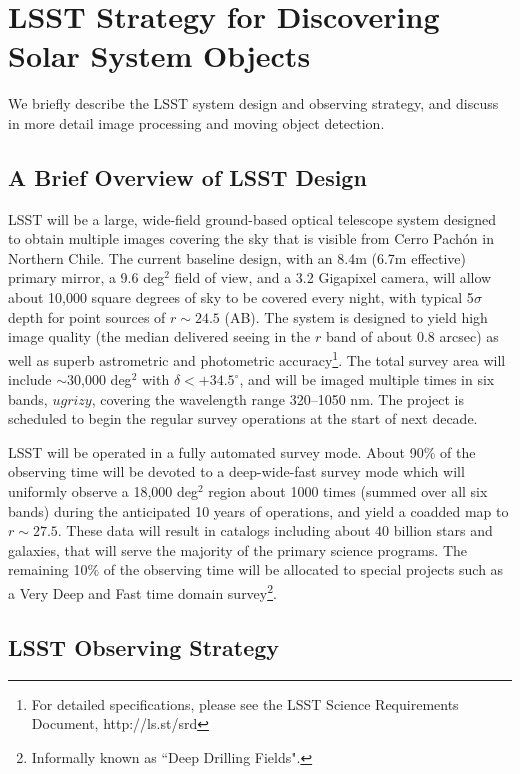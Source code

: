 \section{LSST Strategy for Discovering Solar System Objects} 

We briefly describe the LSST system design and observing strategy, and discuss in more
detail image processing and moving object detection. 

\subsection{A Brief Overview of LSST  Design} 

LSST will be a large, wide-field ground-based optical telescope system
designed to obtain multiple images covering the sky that is visible
from Cerro Pach\'{o}n in Northern Chile. The current baseline design,
with an 8.4m (6.7m effective) primary mirror, a 9.6 deg$^2$ field of
view, and a 3.2 Gigapixel camera, will allow about 10,000 square
degrees of sky to be covered every night, with typical 5$\sigma$ depth 
for point sources of $r\sim24.5$ (AB). The system is designed to yield 
high image quality (the median delivered seeing in the $r$ band of 
about 0.8 arcsec) as well as superb astrometric  and photometric 
accuracy\footnote{For detailed specifications, please see the LSST
Science Requirements Document, http://ls.st/srd}. The total survey
area will include $\sim$30,000 deg$^2$ with $\delta<+34.5^\circ$, and 
will be imaged multiple times in six bands, $ugrizy$, covering the 
wavelength range 320--1050 nm. The project is scheduled to  begin the 
regular survey operations at the start of next decade. 

LSST will be operated in a fully automated survey mode. About 90\% of the 
observing time will be devoted to a deep-wide-fast survey mode which will 
uniformly observe a 18,000 deg$^2$ region about 1000 times (summed over 
all six bands) during the anticipated 10 years of operations, and yield a coadded map 
to $r\sim27.5$. These data will result in catalogs including about
$40$ billion stars and galaxies, that will serve the majority of the
primary science programs. The remaining 10\% of the observing time
will be allocated to special projects such as a Very Deep and Fast
time domain survey\footnote{Informally known as ``Deep Drilling Fields".}.



\subsection{LSST Observing Strategy} 

